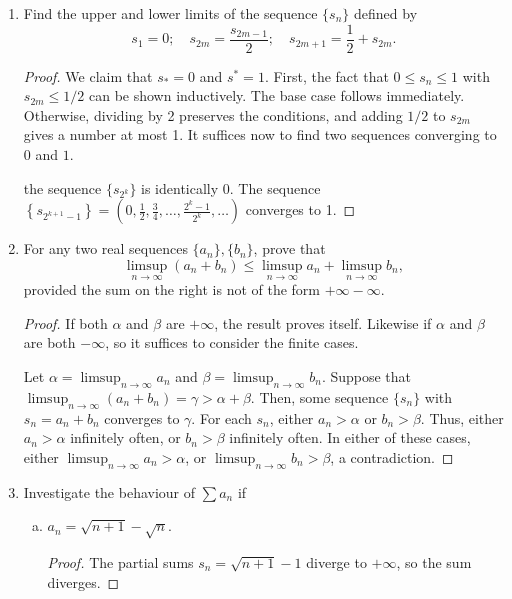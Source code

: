 \begin{enumerate}
\item %
Find the upper and lower limits of the sequence $\{s_n\}$ defined by
\[
	s_1 = 0; \quad s_{2m} = \frac{s_{2m-1}}{2}; \quad s_{2m+1} = \frac{1}{2} + s_{2m}.
\]

\begin{proof}
We claim that $s_* = 0$ and $s^* = 1$. First, the fact that $0 \le s_n \le 1$ with $s_{2m} \le 1/2$ can be shown inductively. The base case follows immediately. Otherwise, dividing by 2 preserves the conditions, and adding $1/2$ to $s_{2m}$ gives a number at most 1. It suffices now to find two sequences converging to $0$ and $1$.

the sequence $\{s_{2^k}\}$ is identically $0$. The sequence $\left\lbrace s_{2^{k+1} - 1}\right\rbrace = \left(0, \frac{1}{2}, \frac{3}{4}, \dotsc, \frac{2^k - 1}{2^k}, \dotsc\right)$ converges to 1. 
\end{proof}

\item %
For any two real sequences $\{a_n\}, \{b_n\}$, prove that
\[
	\limsup_{n \to \infty} (a_n + b_n) \le \limsup_{n \to \infty} a_n + \limsup_{n \to \infty} b_n,
\]
provided the sum on the right is not of the form $+\infty - \infty$.

\begin{proof}
If both $\alpha$ and $\beta$ are $+\infty$, the result proves itself. Likewise if $\alpha$ and $\beta$ are both $-\infty$, so it suffices to consider the finite cases.

Let $\alpha = \limsup_{n \to \infty} a_n$ and $\beta = \limsup_{n \to \infty} b_n$. Suppose that $\limsup_{n \to \infty} (a_n + b_n) = \gamma > \alpha + \beta$. Then, some sequence $\{s_n\}$ with $s_n = a_n + b_n$ converges to $\gamma$. For each $s_n$, either $a_n > \alpha$ or $b_n > \beta$. Thus, either $a_n > \alpha$ infinitely often, or $b_n > \beta$ infinitely often. In either of these cases, either $\limsup_{n \to \infty} a_n > \alpha$, or $\limsup_{n \to \infty} b_n > \beta$, a contradiction.
\end{proof}

\item %
Investigate the behaviour of $\sum a_n$ if
\begin{enumerate}[(a)]
\item $a_n = \sqrt{n + 1} - \sqrt{n}$.

\begin{proof}
The partial sums $s_n = \sqrt{n + 1} - 1$ diverge to $+\infty$, so the sum diverges.
\end{proof}


\end{enumerate}
\end{enumerate}
